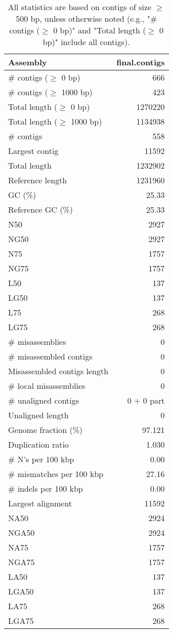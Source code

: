 \documentclass[12pt,a4paper]{article}
\begin{document}
\begin{table}[ht]
\begin{center}
\caption{All statistics are based on contigs of size $\geq$ 500 bp, unless otherwise noted (e.g., "\# contigs ($\geq$ 0 bp)" and "Total length ($\geq$ 0 bp)" include all contigs).}
\begin{tabular}{|l*{1}{|r}|}
\hline
Assembly & final.contigs \\ \hline
\# contigs ($\geq$ 0 bp) & 666 \\ \hline
\# contigs ($\geq$ 1000 bp) & 423 \\ \hline
Total length ($\geq$ 0 bp) & 1270220 \\ \hline
Total length ($\geq$ 1000 bp) & 1134938 \\ \hline
\# contigs & 558 \\ \hline
Largest contig & 11592 \\ \hline
Total length & 1232902 \\ \hline
Reference length & 1231960 \\ \hline
GC (\%) & 25.33 \\ \hline
Reference GC (\%) & 25.33 \\ \hline
N50 & 2927 \\ \hline
NG50 & 2927 \\ \hline
N75 & 1757 \\ \hline
NG75 & 1757 \\ \hline
L50 & 137 \\ \hline
LG50 & 137 \\ \hline
L75 & 268 \\ \hline
LG75 & 268 \\ \hline
\# misassemblies & 0 \\ \hline
\# misassembled contigs & 0 \\ \hline
Misassembled contigs length & 0 \\ \hline
\# local misassemblies & 0 \\ \hline
\# unaligned contigs & 0 + 0 part \\ \hline
Unaligned length & 0 \\ \hline
Genome fraction (\%) & 97.121 \\ \hline
Duplication ratio & 1.030 \\ \hline
\# N's per 100 kbp & 0.00 \\ \hline
\# mismatches per 100 kbp & 27.16 \\ \hline
\# indels per 100 kbp & 0.00 \\ \hline
Largest alignment & 11592 \\ \hline
NA50 & 2924 \\ \hline
NGA50 & 2924 \\ \hline
NA75 & 1757 \\ \hline
NGA75 & 1757 \\ \hline
LA50 & 137 \\ \hline
LGA50 & 137 \\ \hline
LA75 & 268 \\ \hline
LGA75 & 268 \\ \hline
\end{tabular}
\end{center}
\end{table}
\end{document}
